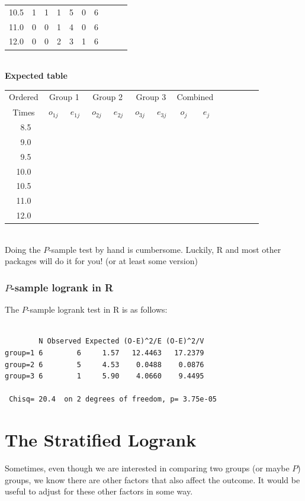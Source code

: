 \documentclass[11pt,slidesonly,semrot,portrait,palatino]{book}
\begin{document}
{\begin{center}
\begin{tabular}{cccccccccc}
10.5  & 1 & 1  & 1 & 5 & 0 & 6\\
11.0    & 0  &0  & 1 & 4 & 0 & 6\\
12.0    & 0  &0  & 2 & 3 & 1 & 6\\ \hline
\end{tabular}
~\\[3ex]
{\bf Expected table}
\\[2ex]
\begin{tabular}{cccccccccccccc}
\hline
Ordered  & \multicolumn{2}{c}{Group 1}& \multicolumn{2}{c}{Group 2} &  \multicolumn{2}{c}{Group 3} &\multicolumn{2}{c}{Combined}  \\
\cline{2-3} \cline{4-5} \cline{6-7}
Times & $~o_{1j}~$ & $~e_{1j}~$  & $~o_{2j}~$ & $~e_{2j}~$  &
$~o_{3j}~$ & $~e_{3j}~$  & $~o_{j}~$ & $~e_{j}~$ &\\ \hline
~8.5   &  \\
~9.0     & \\
~9.5   & \\
10.0    & \\
10.5  & \\
11.0    & \\
12.0    & \\ \hline
\end{tabular}
\end{center}
~\\[3ex]
Doing the $P$-sample test by hand is cumbersome. Luckily, R and most other packages will do it for you!
(or at least some version)
\subsubsection{$P$-sample logrank in R}
The $P$-sample logrank test in R is as follows:
\begin{verbatim}

        N Observed Expected (O-E)^2/E (O-E)^2/V
group=1 6        6     1.57   12.4463   17.2379
group=2 6        5     4.53    0.0488    0.0876
group=3 6        1     5.90    4.0660    9.4495

 Chisq= 20.4  on 2 degrees of freedom, p= 3.75e-05
\end{verbatim}
\section{The Stratified Logrank}
Sometimes, even though we are interested in comparing two groups (or
maybe $P$) groups, we know there are other factors that also
affect the outcome.  It would be useful to adjust for these
other factors in some way.
}
\end{document}
